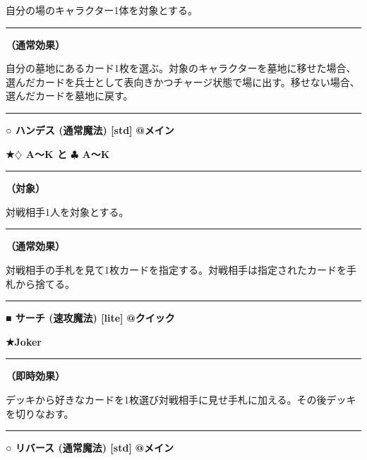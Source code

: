 \documentclass[twocolumn,a5paper,papersize,10pt]{jarticle}
\begin{document}
自分の場のキャラクター1体を対象とする。
\vspace{1mm}%
\hrule height 0.1mm depth 0mm width 66.5mm %
\vspace{1mm}%

{\bf（通常効果）}

自分の墓地にあるカード1枚を選ぶ。対象のキャラクターを墓地に移せた場合、選んだカードを兵士として表向きかつチャージ状態で場に出す。移せない場合、選んだカードを墓地に戻す。
\vspace{2mm} %
\hrule height 0.5mm depth 0mm width 66.5mm %
\vspace{1mm} %
{\small\bf ○ ハンデス {\scriptsize (通常魔法) [std]}} %
\hfill 
{\footnotesize\bf @メイン }

{\footnotesize\bf ★{\normalsize $\diamondsuit$} A〜K と {\normalsize $\clubsuit$} A〜K}

\vspace{1mm}%
\hrule height 0.1mm depth 0mm width 66.5mm %
\vspace{1mm}%
{\bf（対象）}

対戦相手1人を対象とする。
\vspace{1mm}%
\hrule height 0.1mm depth 0mm width 66.5mm %
\vspace{1mm}%

{\bf（通常効果）}

対戦相手の手札を見て1枚カードを指定する。対戦相手は指定されたカードを手札から捨てる。
\vspace{2mm} %
\hrule height 0.5mm depth 0mm width 66.5mm %
\vspace{1mm} %
{\small\bf ■ サーチ {\scriptsize (速攻魔法) [lite]}} %
\hfill 
{\footnotesize\bf @クイック }

{\footnotesize\bf ★Joker}

\vspace{1mm}%
\hrule height 0.1mm depth 0mm width 66.5mm %
\vspace{1mm}%

{\bf（即時効果）}

デッキから好きなカードを1枚選び対戦相手に見せ手札に加える。その後デッキを切りなおす。
\vspace{2mm} %
\hrule height 0.5mm depth 0mm width 66.5mm %
\vspace{1mm} %
{\small\bf ○ リバース {\scriptsize (通常魔法) [std]}} %
\hfill 
{\footnotesize\bf @メイン }
\end{document}
